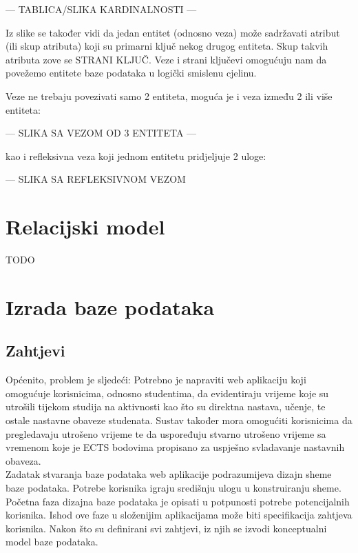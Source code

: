 \documentclass[times, utf8, zavrsni]{fer}
\begin{document}
--- TABLICA/SLIKA KARDINALNOSTI ---

Iz slike se također vidi da jedan entitet (odnosno veza) može sadržavati atribut (ili skup atributa) koji su primarni ključ nekog drugog entiteta. Skup takvih atributa zove se STRANI KLJUČ. Veze i strani ključevi omogućuju nam da povežemo entitete baze podataka u logički smislenu cjelinu.

Veze ne trebaju povezivati samo 2 entiteta, moguća je i veza između 2 ili više entiteta:

--- SLIKA SA VEZOM OD 3 ENTITETA ---

kao i refleksivna veza koji jednom entitetu pridjeljuje 2 uloge:

--- SLIKA SA REFLEKSIVNOM VEZOM

\section{Relacijski model}

TODO

\section{Izrada baze podataka}
\subsection{Zahtjevi}

Općenito, problem je sljedeći:
Potrebno je napraviti web aplikaciju koji omogućuje korisnicima, odnosno studentima, da evidentiraju vrijeme koje su utrošili tijekom studija na aktivnosti kao što su direktna nastava, učenje, te ostale nastavne obaveze studenata. Sustav također mora omogućiti korisnicima da pregledavaju utrošeno vrijeme te da uspoređuju stvarno utrošeno vrijeme sa vremenom koje je ECTS bodovima propisano za uspješno svladavanje nastavnih obaveza.\\

Zadatak stvaranja baze podataka web aplikacije podrazumijeva dizajn sheme baze podataka. Potrebe korisnika igraju središnju ulogu u konstruiranju sheme. Početna faza dizajna baze podataka je opisati u potpunosti potrebe potencijalnih korisnika. Ishod ove faze u složenijim aplikacijama može biti specifikacija zahtjeva korisnika. Nakon što su definirani svi zahtjevi, iz njih se izvodi konceptualni model baze podataka.\\
\end{document}
